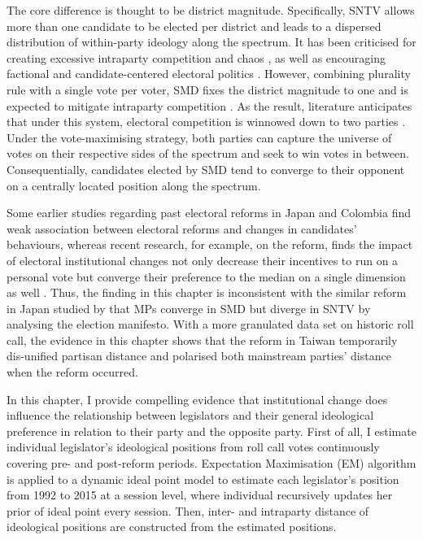 The core difference is thought to be district magnitude. Specifically, SNTV allows more than one candidate to be elected per district and leads to a dispersed distribution of within-party ideology along the spectrum. It has been criticised for creating excessive intraparty competition and chaos \citep[][]{Cox1990, Hirano2006, Ames1995}, as well as encouraging factional and candidate-centered electoral politics \citep[e.g.][]{Batto2016, Wu2003}. However, combining plurality rule with a single vote per voter, SMD fixes the district magnitude to one and is expected to mitigate intraparty competition \citep[][]{Carey1995, Shugart2003, Andre2014}. As the result, literature anticipates that under this system, electoral competition is winnowed down to two parties \citep[][]{Catalinac2016}. Under the vote-maximising strategy, both parties can capture the universe of votes on their respective sides of the spectrum and seek to win votes in between. Consequentially, candidates elected by SMD tend to converge to their opponent on a centrally located position along the spectrum.

Some earlier studies regarding past electoral reforms in Japan and Colombia \citep[e.g.,][]{Hideo1998, Crisp2002, Christensen1994} find weak association between electoral reforms and changes in candidates' behaviours, whereas recent research, for example, on the reform, finds the impact of electoral institutional changes not only decrease their incentives to run on a personal vote \citep[e.g.,][]{Catalinac2017, Sheng2014a} but converge their preference to the median on a single dimension as well \citep[e.g.,][]{Catalinac2017, Catalinac2016, Sheng2014a}. Thus, the finding in this chapter is inconsistent with the similar reform in Japan studied by \citet{Catalinac2016} that MPs converge in SMD but diverge in SNTV by analysing the election manifesto. With a more granulated data set on historic roll call, the evidence in this chapter shows that the reform in Taiwan temporarily dis-unified partisan distance and polarised both mainstream parties' distance when the reform occurred. 

In this chapter, I provide compelling evidence that institutional change does influence the relationship between legislators and their general ideological preference in relation to their party and the opposite party. First of all, I estimate individual legislator's ideological positions from roll call votes continuously covering pre- and post-reform periods. Expectation Maximisation (EM) algorithm is applied to a dynamic ideal point model to estimate each legislator's position from 1992 to 2015 at a session level, where individual recursively updates her prior of ideal point every session. Then, inter- and intraparty distance of ideological positions are constructed from the estimated positions. 

